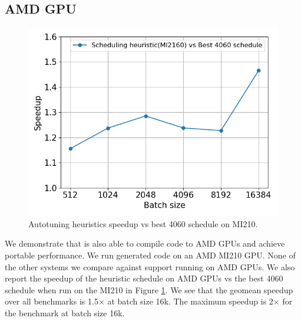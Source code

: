 \subsection{AMD GPU}
\begin{figure}[htb]
  \centering
  \includegraphics[width=0.75\linewidth]{figures/geomean_speedup_AMDMI2160_4060_vs_MI2160.png}
  \caption{Autotuning heuristics speedup vs best 4060 schedule on MI210.}
  \label{Fig:AMD_MI210_ATHeuristicVs4060Sched_speedup}
\end{figure}
We demonstrate that \Treebeard{} is also able to compile code to AMD GPUs and achieve portable performance. We run generated code on an AMD MI210 GPU. None of the other systems we compare against support running on AMD GPUs. We also report the speedup of the heuristic schedule on AMD GPUs vs the best 4060 schedule when run on the MI210 in Figure \ref{Fig:AMD_MI210_ATHeuristicVs4060Sched_speedup}. We see that the geomean speedup over all benchmarks is 1.5$\times$ at batch size 16k. The maximum speedup is 2$\times$ for the  benchmark at batch size 16k.


